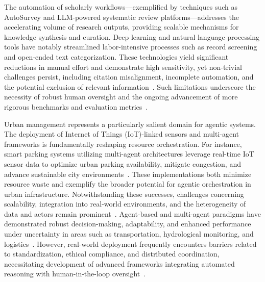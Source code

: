 The automation of scholarly workflows—exemplified by techniques such as AutoSurvey and LLM-powered systematic review platforms—addresses the accelerating volume of research outputs, providing scalable mechanisms for knowledge synthesis and curation. Deep learning and natural language processing tools have notably streamlined labor-intensive processes such as record screening and open-ended text categorization. These technologies yield significant reductions in manual effort and demonstrate high sensitivity, yet non-trivial challenges persist, including citation misalignment, incomplete automation, and the potential exclusion of relevant information~\cite{ref25,ref26,ref27,ref28,ref29,ref30,ref45,ref58,ref59,ref76,ref80,ref86,ref88,ref91,ref92,ref93,ref94,ref95,ref96,ref97,ref98,ref99,ref100,ref104}. Such limitations underscore the necessity of robust human oversight and the ongoing advancement of more rigorous benchmarks and evaluation metrics~\cite{ref29,ref30,ref45,ref99,ref100,ref104}.

Urban management represents a particularly salient domain for agentic systems. The deployment of Internet of Things (IoT)-linked sensors and multi-agent frameworks is fundamentally reshaping resource orchestration. For instance, smart parking systems utilizing multi-agent architectures leverage real-time IoT sensor data to optimize urban parking availability, mitigate congestion, and advance sustainable city environments~\cite{ref20}. These implementations both minimize resource waste and exemplify the broader potential for agentic orchestration in urban infrastructure. Notwithstanding these successes, challenges concerning scalability, integration into real-world environments, and the heterogeneity of data and actors remain prominent~\cite{ref20,ref40,ref111,ref113,ref114}. Agent-based and multi-agent paradigms have demonstrated robust decision-making, adaptability, and enhanced performance under uncertainty in areas such as transportation, hydrological monitoring, and logistics~\cite{ref40,ref45,ref91,ref92,ref93,ref111,ref113,ref114}. However, real-world deployment frequently encounters barriers related to standardization, ethical compliance, and distributed coordination, necessitating development of advanced frameworks integrating automated reasoning with human-in-the-loop oversight~\cite{ref30,ref40,ref45,ref58,ref91,ref92,ref93,ref94,ref95,ref96,ref113,ref114,ref115}.

